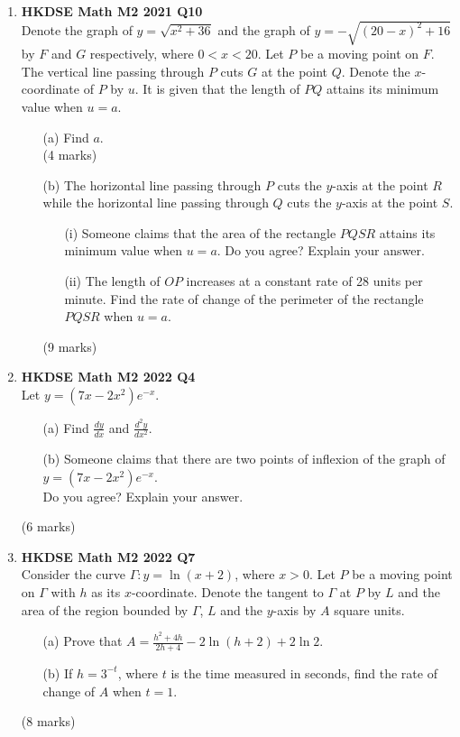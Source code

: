 \documentclass{report}
\begin{document}
\begin{enumerate}
	\item \textbf{HKDSE Math M2 2021 Q10}\\
	Denote the graph of $y = \sqrt{x^2+36} $ and the graph of $y = - \sqrt{(20-x)^2+16}$ by $F$ and $G$ respectively, where $0 < x<20$. Let $P$ be a moving point on $F$. The vertical line passing through $P$ cuts $G$ at the point $Q$. Denote the $x$-coordinate of $P$ by $u$. It is given that the length of $PQ$ attains its minimum value when $u=a$.
	\begin{enumerate}
		\item [(a)] Find $a$.\\(4 marks)
		\item [(b)] The horizontal line passing through $P$ cuts the $y$-axis at the point $R$ while the horizontal line passing through $Q$ cuts the $y$-axis at the point $S$.
		\begin{enumerate}
			\item [(i)] Someone claims that the area of the rectangle $PQSR$ attains its minimum value when $u = a$. Do you agree? Explain your answer. 
			\item [(ii)] The length of $OP$ increases at a constant rate of 28 units per minute. Find the rate of change of the perimeter of the rectangle $PQSR$ when $u = a$.
		\end{enumerate}
		(9 marks)
	\end{enumerate}

	\newpage

	\item \textbf{HKDSE Math M2 2022 Q4}\\
	Let $y = (7x - 2x^2)e^{-x}$.
	\begin{enumerate}
		\item[(a)]
		Find $\displaystyle \frac{dy}{dx}$ and $\displaystyle \frac{d^2y}{dx^2}$. 
		\item[(b)]
		Someone claims that there are two points of inflexion of the graph of $y = (7x - 2x^2)e^{-x}$. \\
		Do you agree? Explain your answer. 
	\end{enumerate}
	(6 marks)

	\item \textbf{HKDSE Math M2 2022 Q7}\\
	Consider the curve $\Gamma : y = \ln{(x+2)}$, where $x > 0$. Let $P$ be a moving point on $\Gamma$ with $h$ as its $x$-coordinate. Denote the tangent to $\Gamma$ at $P$ by $L$ and the area of the region bounded by $\Gamma$, $L$ and the $y$-axis by $A$ square units.
	\begin{enumerate}
		\item [(a)]Prove that $\displaystyle A = \frac{h^2+4h}{2h+4} - 2\ln{(h+2)} + 2\ln{2}$.
		\item [(b)]If $h = 3^{-t}$, where $t$ is the time measured in seconds, find the rate of change of $A$ when $t = 1$.
	\end{enumerate}
	(8 marks)


\end{enumerate}
\end{document}
